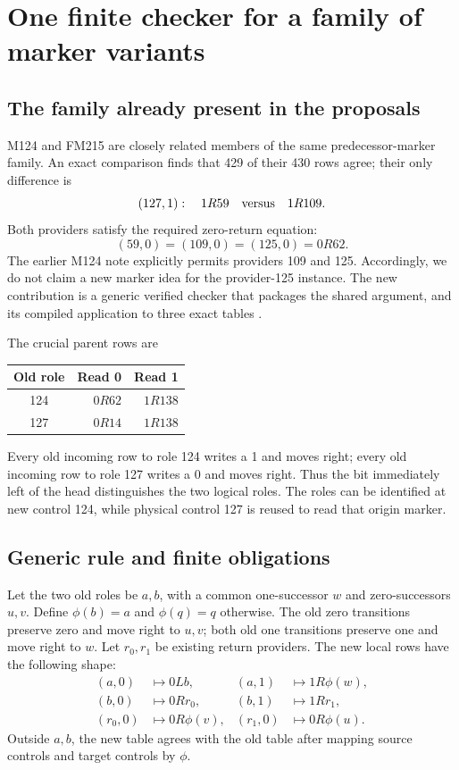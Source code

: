 \section{One finite checker for a family of marker variants}\label{sec:markers}

\subsection{The family already present in the proposals}

M124 and FM215 are closely related members of the same predecessor-marker
family. An exact comparison finds that 429 of their 430 rows agree; their
only difference is
\[
 (127,1):\quad 1R59\quad\hbox{versus}\quad 1R109.
\]
Both providers satisfy the required zero-return equation:
\[
 (59,0)=(109,0)=(125,0)=0R62.
\]
The earlier M124 note explicitly permits providers 109 and 125. Accordingly,
we do not claim a new marker idea for the provider-125 instance. The new
contribution is a generic verified checker that packages the shared argument,
and its compiled application to three exact tables \cite{incoming}.

The crucial parent rows are
\begin{center}
\begin{tabular}{@{}crr@{}}\toprule
Old role & Read 0 & Read 1\\\midrule
124 & $0R62$ & $1R138$\\
127 & $0R14$ & $1R138$\\\bottomrule
\end{tabular}
\end{center}
Every old incoming row to role 124 writes a 1 and moves right; every old
incoming row to role 127 writes a 0 and moves right. Thus the bit immediately
left of the head distinguishes the two logical roles. The roles can be
identified at new control 124, while physical control 127 is reused to read
that origin marker.

\subsection{Generic rule and finite obligations}

Let the two old roles be \(a,b\), with a common one-successor \(w\) and
zero-successors \(u,v\). Define \(\phi(b)=a\) and \(\phi(q)=q\) otherwise.
The old zero transitions preserve zero and move right to \(u,v\); both old
one transitions preserve one and move right to \(w\). Let \(r_0,r_1\) be
existing return providers. The new local rows have the following shape:
\begin{align*}
 (a,0)&\mapsto 0Lb,&(a,1)&\mapsto 1R\phi(w),\\
 (b,0)&\mapsto 0Rr_0,&(b,1)&\mapsto 1Rr_1,\\
 (r_0,0)&\mapsto 0R\phi(v),&(r_1,0)&\mapsto 0R\phi(u).
\end{align*}
Outside \(a,b\), the new table agrees with the old table after mapping
source controls and target controls by \(\phi\).


